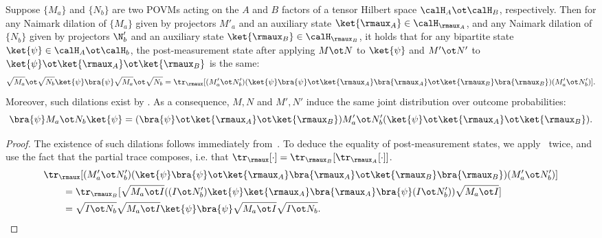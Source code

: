 \begin{corollary}\label{cor:bipartite-naimark}
  Suppose $\{M_a\}$ and $\{N_b\}$ are two POVMs acting on the $A$ and
  $B$ factors of a tensor Hilbert space $\calH_{A} \ot \calH_{B}$,
  respectively. Then for any Naimark dilation of $\{M_a\}$ given by
  projectors $M'_a$ and an auxiliary state $\ket{\rmaux_A} \in
  \calH_{\rmaux_A}$, and any Naimark dilation of $\{N_b\}$ given by
  projectors $\N'_b$ and an auxiliary state
  $\ket{\rmaux_B} \in \calH_{\rmaux_B}$, it holds that for any bipartite state $\ket{\psi} \in
  \calH_{A} \ot \calH_{b}$, the post-measurement state after applying
  $M \ot N$ to $\ket{\psi}$ and $M' \ot N'$ to $\ket{\psi} \ot
  \ket{\rmaux_A} \ot \ket{\rmaux_B}$ is the same:
  \[ \sqrt{M_a} \ot \sqrt{N_b}  \ket{\psi} \bra{\psi}  \sqrt{M_a} \ot
    \sqrt{N_b} = \tr_{\rmaux}[ (M'_a \ot N'_b) (\ket{\psi}\bra{\psi}
    \ot \ket{\rmaux_{A}}\bra{\rmaux_{A}} \ot
    \ket{\rmaux_B}\bra{\rmaux_B} )(M'_a \ot N'_b)]. \]
  Moreover, such dilations exist by .
  As a consequence, $M, N$ and $M', N'$ induce the same joint
  distribution over outcome probabilities:
  \[ \bra{\psi} M_a \ot N_b \ket{\psi} = (\bra{\psi} \ot
    \ket{\rmaux_A} \ot \ket{\rmaux_B}) M'_a \ot N'_b (\ket{\psi} \ot
    \ket{\rmaux_A} \ot \ket{\rmaux_B}). \]
\end{corollary}
\begin{proof}
  The existence of such dilations follows immediately
  from~. To deduce the equality of post-measurement
  states, we apply~ twice, and use the fact that the partial
  trace composes, i.e. that $\tr_{\rmaux}[\cdot] = \tr_{\rmaux_B}[\tr_{\rmaux_A}[\cdot]]$.
  \begin{align*}
    &\tr_{\rmaux}[ (M'_a \ot N'_b) (\ket{\psi}\bra{\psi}
    \ot \ket{\rmaux_{A}}\bra{\rmaux_{A}} \ot
      \ket{\rmaux_B}\bra{\rmaux_B}) (M'_a \ot N'_b)]\\
    &\qquad= \tr_{\rmaux_B}[
                                                    \sqrt{M_a \ot I}
                                                    ((I \ot N'_b) \ket{\psi}
                                                    \ket{\rmaux_A}
                                                    \bra{\rmaux_A}
                                                    \bra{\psi} (I \ot
                                                    N'_b)) \sqrt{M_a
                                                    \ot I}] \\
    &\qquad= \sqrt{I \ot N_b} \sqrt{M_a \ot I} \ket{\psi} \bra{\psi}
      \sqrt{M_a \ot I} \sqrt{I \ot N_b}.\qedhere 
  \end{align*}
\end{proof}


